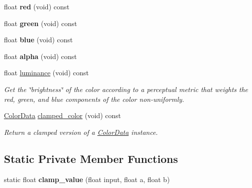 \begin{DoxyCompactItemize}
\item 
float {\bfseries red} (void) const \hypertarget{classimage__tools_1_1ColorData_a04fece12dab6d561a8fe5ac12f1c410d}{}\label{classimage__tools_1_1ColorData_a04fece12dab6d561a8fe5ac12f1c410d}

\item 
float {\bfseries green} (void) const \hypertarget{classimage__tools_1_1ColorData_a2dcb46013051c45a25386383e6d97e94}{}\label{classimage__tools_1_1ColorData_a2dcb46013051c45a25386383e6d97e94}

\item 
float {\bfseries blue} (void) const \hypertarget{classimage__tools_1_1ColorData_a3b27c4b8e5cf45c388e348fc01c3eeaf}{}\label{classimage__tools_1_1ColorData_a3b27c4b8e5cf45c388e348fc01c3eeaf}

\item 
float {\bfseries alpha} (void) const \hypertarget{classimage__tools_1_1ColorData_a8ae370ebb683fcfab1ce7dfdac9f78a2}{}\label{classimage__tools_1_1ColorData_a8ae370ebb683fcfab1ce7dfdac9f78a2}

\item 
float \hyperlink{classimage__tools_1_1ColorData_a9bea35824e209d2c216739fdc8b9bf3f}{luminance} (void) const \hypertarget{classimage__tools_1_1ColorData_a9bea35824e209d2c216739fdc8b9bf3f}{}\label{classimage__tools_1_1ColorData_a9bea35824e209d2c216739fdc8b9bf3f}

\begin{DoxyCompactList}\small\item\em Get the \char`\"{}brightness\char`\"{} of the color according to a perceptual metric that weights the red, green, and blue components of the color non-\/uniformly. \end{DoxyCompactList}\item 
\hyperlink{classimage__tools_1_1ColorData}{Color\+Data} \hyperlink{classimage__tools_1_1ColorData_add7ac66b4e579f06f59f03c2206a0429}{clamped\+\_\+color} (void) const 
\begin{DoxyCompactList}\small\item\em Return a clamped version of a \hyperlink{classimage__tools_1_1ColorData}{Color\+Data} instance. \end{DoxyCompactList}\end{DoxyCompactItemize}
\subsection*{Static Private Member Functions}
\begin{DoxyCompactItemize}
\item 
static float {\bfseries clamp\+\_\+value} (float input, float a, float b)\hypertarget{classimage__tools_1_1ColorData_ac9c19726be7a97e13b6916ed26822740}{}\label{classimage__tools_1_1ColorData_ac9c19726be7a97e13b6916ed26822740}

\end{DoxyCompactItemize}
